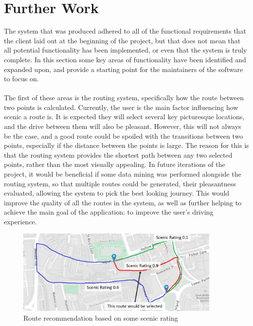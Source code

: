 \section{Further Work}
The system that was produced adhered to all of the functional requirements that the client laid out at the beginning of the project, but that does not mean that all potential functionality has been implemented, or even that the system is truly complete. In this section some key areas of functionality have been identified and expanded upon, and provide a starting point for the maintainers of the software to focus on.\ \\
\ \\
The first of these areas is the routing system, specifically how the route between two points is calculated. Currently, the user is the main factor influencing how scenic a route is. It is expected they will select several key picturesque locations, and the drive between them will also be pleasant. However, this will not always be the case, and a good route could be spoiled with the transitions between two points, especially if the distance between the points is large. The reason for this is that the routing system provides the shortest path between any two selected points, rather than the most visually appealing. In future iterations of the project, it would be beneficial if some data mining was performed alongside the routing system, so that multiple routes could be generated, their pleasantness evaluated, allowing the system to pick the best looking journey. This would improve the quality of all the routes in the system, as well as further helping to achieve the main goal of the application: to improve the user's driving experience.\ \\
\begin{figure}[!ht]
	\vspace{-3mm}
	\begin{center}
		\includegraphics[width=0.9\textwidth]{images/further/alt.png}
	\end{center}
	\vspace{-6mm}
	\caption{Route recommendation based on some scenic rating}	
\end{figure}

